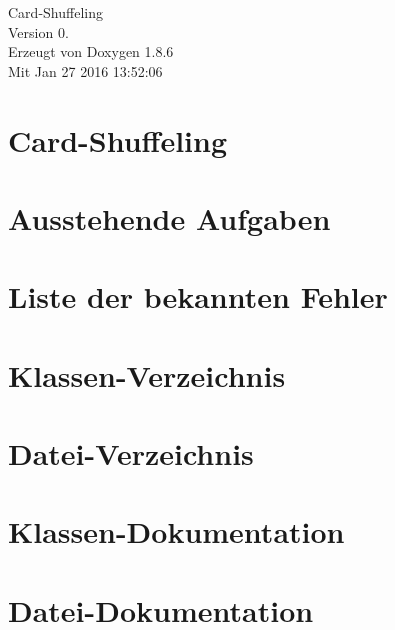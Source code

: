 \documentclass[twoside]{article}
\begin{document}
\hypersetup{pageanchor=false}
\begin{titlepage}
\vspace*{7cm}
\begin{center}%
{\Large Card-\/\-Shuffeling \\[1ex]\large Version 0. }\\
\vspace*{1cm}
{\large Erzeugt von Doxygen 1.8.6}\\
\vspace*{0.5cm}
{\small Mit Jan 27 2016 13:52:06}\\
\end{center}
\end{titlepage}
\tableofcontents
{}
\hypersetup{pageanchor=true}

\section{Card-\/\-Shuffeling}
\label{index}\hypertarget{index}{}
\section{Ausstehende Aufgaben}
\label{dd/da0/todo}
\hypertarget{dd/da0/todo}{}

\section{Liste der bekannten Fehler}
\label{de/da5/bug}
\hypertarget{de/da5/bug}{}

\section{Klassen-\/\-Verzeichnis}

\section{Datei-\/\-Verzeichnis}

\section{Klassen-\/\-Dokumentation}





\section{Datei-\/\-Dokumentation}









\newpage
{}
{}
\printindex
\end{document}
